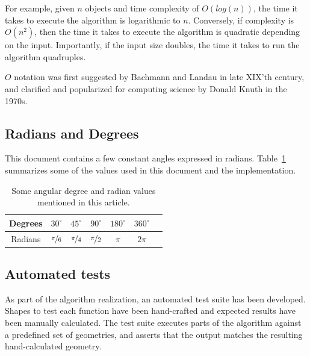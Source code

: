 \documentclass[a4paper]{article}
\begin{document}
\begin{description}
        For example, given $n$ objects and time complexity of $O(log(n))$, the
        time it takes to execute the algorithm is logarithmic to $n$.
        Conversely, if complexity is $O(n^2)$, then the time it takes to
        execute the algorithm is quadratic depending on the input. Importantly,
        if the input size doubles, the time it takes to run the algorithm
        quadruples.

        $O$ notation was first suggested by
        Bachmann\cite{bachmann1894analytische} and
        Landau\cite{landau1911} in late XIX'th century, and clarified
        and popularized for computing science by Donald
        Knuth\cite{knuth1976big} in the 1970s.

\end{description}

\subsection{Radians and Degrees}

This document contains a few constant angles expressed in radians.
Table~\ref{table:radians} summarizes some of the values used in this document
and the implementation.

\begin{table}[h]
    \centering
    \begin{tabular}{|c|c|c|c|c|c|c|}
        \hline
        Degrees & $30^\circ$          & $45^\circ$          & $90^\circ$          & $180^\circ$ & $360^\circ$ \\
        \hline
        Radians & $\nicefrac{\pi}{6}$ & $\nicefrac{\pi}{4}$ & $\nicefrac{\pi}{2}$ & $\pi$       & $2\pi$ \\
        \hline
    \end{tabular}
    \caption{Some angular degree and radian values mentioned in this article.}
    \label{table:radians}
\end{table}

\subsection{Automated tests}
\label{sec:automated-tests}

As part of the algorithm realization, an automated test suite has been
developed. Shapes to test each function have been hand-crafted and expected
results have been manually calculated. The test suite executes parts of the
algorithm against a predefined set of geometries, and asserts that the output
matches the resulting hand-calculated geometry.
\end{document}
